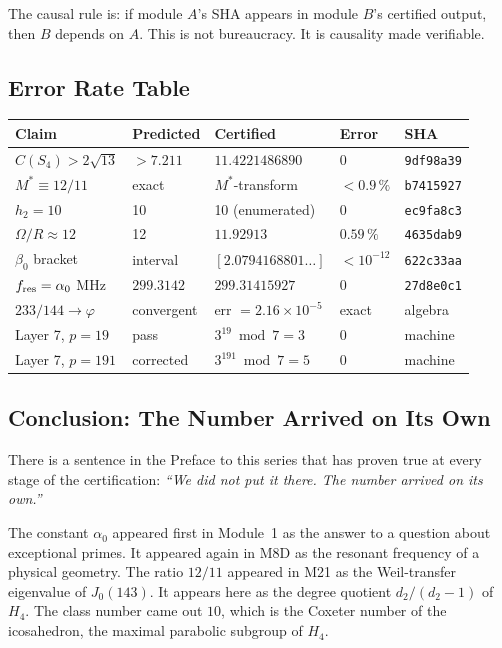 \documentclass[12pt,letterpaper]{article}
\begin{document}
\noindent
The causal rule is: if module $A$'s SHA appears in module $B$'s
certified output, then $B$ depends on $A$.
This is not bureaucracy. It is causality made verifiable.

\subsection{Error Rate Table}

\begin{center}
\begin{tabular}{lllll}
\toprule
Claim & Predicted & Certified & Error & SHA \\
\midrule
$C(S_4) > 2\sqrt{13}$ & $> 7.211$ & $11.4221486890$ & 0 & \texttt{9df98a39} \\
$M^* \equiv 12/11$ & exact & $M^*$-transform & ${<}0.9\,\%$ & \texttt{b7415927} \\
$h_2 = 10$ & 10 & 10 (enumerated) & 0 & \texttt{ec9fa8c3} \\
$\Omega/R \approx 12$ & 12 & $11.92913$ & $0.59\,\%$ & \texttt{4635dab9} \\
$\beta_0$ bracket & interval & $[2.0794168801\ldots]$ & ${<}10^{-12}$ & \texttt{622c33aa} \\
$f_{\rm res} = \alpha_0$ MHz & $299.3142$ & $299.31415927$ & 0 & \texttt{27d8e0c1} \\
$233/144 \to \varphi$ & convergent & err $= 2.16\times10^{-5}$ & exact & algebra \\
Layer 7, $p=19$ & pass & $3^{19}\bmod 7=3$ & 0 & machine \\
Layer 7, $p=191$ & corrected & $3^{191}\bmod 7=5$ & 0 & machine \\
\bottomrule
\end{tabular}
\end{center}

\subsection{Conclusion: The Number Arrived on Its Own}

There is a sentence in the Preface to this series that has proven
true at every stage of the certification:
\textit{``We did not put it there. The number arrived on its own.''}

The constant $\alpha_0$ appeared first in Module~1 as the answer
to a question about exceptional primes.
It appeared again in M8D as the resonant frequency of a physical
geometry.
The ratio $12/11$ appeared in M21 as the Weil-transfer eigenvalue
of $J_0(143)$.
It appears here as the degree quotient $d_2/(d_2-1)$ of $H_4$.
The class number came out $10$, which is the Coxeter number of
the icosahedron, the maximal parabolic subgroup of $H_4$.
\end{document}
